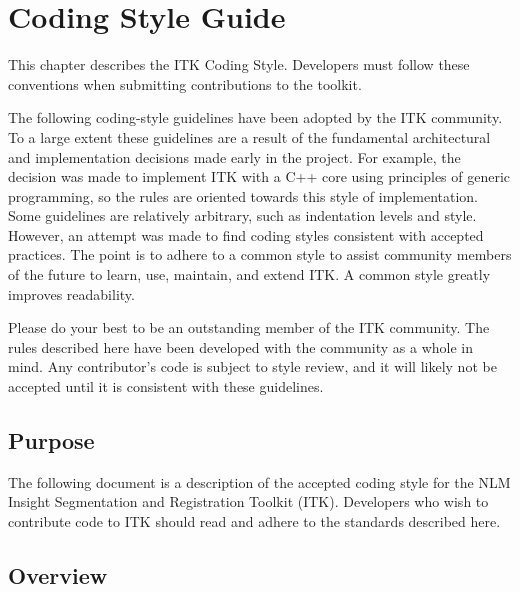 \chapter{Coding Style Guide}
\label{ch:CodingStyleGuide}

This chapter describes the ITK Coding Style. Developers must follow these
conventions when submitting contributions to the toolkit.

The following coding-style guidelines have been adopted by the ITK community.
To a large extent these guidelines are a result of the fundamental
architectural and implementation decisions made early in the project. For
example, the decision was made to implement ITK with a C++ core using
principles of generic programming, so the rules are oriented towards this style
of implementation. Some guidelines are relatively arbitrary, such as
indentation levels and style. However, an attempt was made to find coding
styles consistent with accepted practices. The point is to adhere to a common
style to assist community members of the future to learn, use, maintain, and
extend ITK. A common style greatly improves readability.

Please do your best to be an outstanding member of the ITK community. The rules
described here have been developed with the community as a whole in mind.
Any contributor's code is subject to style review, and it will likely not be
accepted until it is consistent with these guidelines.


\section{Purpose}
\label{sec:Purpose}

The following document is a description of the accepted coding style for the
NLM Insight Segmentation and Registration Toolkit (ITK). Developers who wish
to contribute code to ITK should read and adhere to the standards described
here.


\section{Overview}
\label{sec:Overview}

